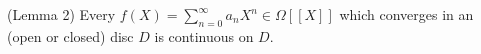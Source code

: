 (Lemma 2) Every $f(X) = \sum_{n=0}^\infty a_n X^n \in \Omega[[X]]$ which converges in an (open or closed) disc $D$ is continuous on $D$.